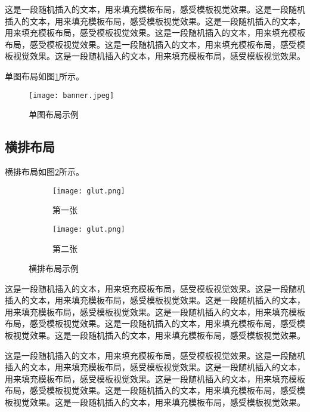    这是一段随机插入的文本，用来填充模板布局，感受模板视觉效果。这是一段随机插入的文本，用来填充模板布局，感受模板视觉效果。这是一段随机插入的文本，用来填充模板布局，感受模板视觉效果。这是一段随机插入的文本，用来填充模板布局，感受模板视觉效果。这是一段随机插入的文本，用来填充模板布局，感受模板视觉效果。这是一段随机插入的文本，用来填充模板布局，感受模板视觉效果。

单图布局如图\ref{F.glut_single}所示。

\begin{figure}[hbt]
\centering
\texttt{[image: banner.jpeg]}
\caption{单图布局示例}
\label{F.glut_single}
\end{figure}

\subsection{横排布局}

横排布局如图\ref{F.glut_row}所示。

\begin{figure}[!htb]
    \centering
    \begin{subfigure}[t]{0.24\linewidth}
        \begin{minipage}[b]{1\linewidth}
        \texttt{[image: glut.png]}
        \caption{第一张}
        \end{minipage}
    \end{subfigure}
    \begin{subfigure}[t]{0.24\linewidth}
        \begin{minipage}[b]{1\linewidth}
        \texttt{[image: glut.png]}
        \caption{第二张}
        \end{minipage}
    \end{subfigure}
    \caption{横排布局示例}
    \label{F.glut_row}
\end{figure}

    这是一段随机插入的文本，用来填充模板布局，感受模板视觉效果。这是一段随机插入的文本，用来填充模板布局，感受模板视觉效果。这是一段随机插入的文本，用来填充模板布局，感受模板视觉效果。这是一段随机插入的文本，用来填充模板布局，感受模板视觉效果。这是一段随机插入的文本，用来填充模板布局，感受模板视觉效果。这是一段随机插入的文本，用来填充模板布局，感受模板视觉效果。
    
    这是一段随机插入的文本，用来填充模板布局，感受模板视觉效果。这是一段随机插入的文本，用来填充模板布局，感受模板视觉效果。这是一段随机插入的文本，用来填充模板布局，感受模板视觉效果。这是一段随机插入的文本，用来填充模板布局，感受模板视觉效果。这是一段随机插入的文本，用来填充模板布局，感受模板视觉效果。这是一段随机插入的文本，用来填充模板布局，感受模板视觉效果。

